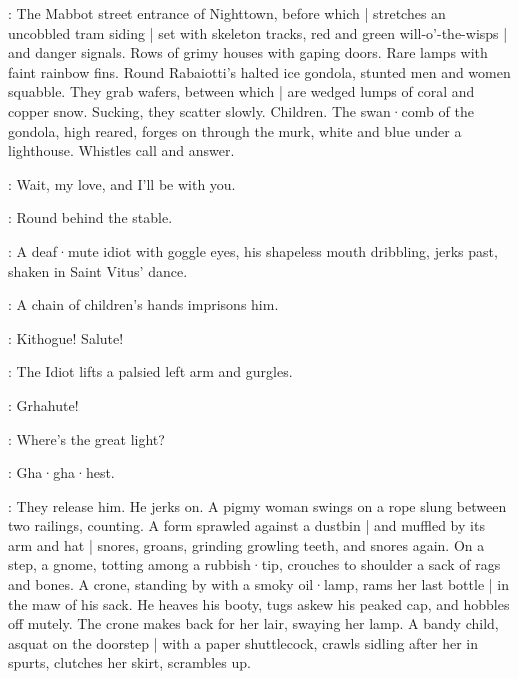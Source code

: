 
:
The Mabbot street entrance of Nighttown,
before which |
stretches an uncobbled tram siding |
set with skeleton tracks,
red and green will-o'-the-wisps |
and danger signals.
Rows of grimy houses with gaping doors.
Rare lamps with faint rainbow fins.
Round Rabaiotti's halted ice gondola,
stunted men and women squabble.
They grab wafers,
between which |
are wedged lumps of coral and copper snow.
Sucking,
they scatter slowly.
Children.
The swan·comb of the gondola,
high reared,
forges on through the murk,
white and blue under a lighthouse.
Whistles call and answer.

\Calls:
Wait,
my love,
and I'll be with you.

\Answers:
Round behind the stable.

:
A deaf·mute idiot with goggle eyes,
his shapeless mouth dribbling,
jerks past,
shaken in Saint Vitus' dance.

:
A chain of children's hands imprisons him.

\Children:
Kithogue!
Salute!

:
The Idiot lifts a palsied left arm and gurgles.

\Idiot:
Grhahute!%

\Children:
Where's the great light?

\Idiot:
Gha·gha·hest.

:
They release him.
He jerks on.
A pigmy woman swings on a rope slung between two railings,
counting.
A form sprawled against a dustbin |
and muffled by its arm and hat |
snores,
groans,
grinding growling teeth,
and snores again.
On a step,
a gnome,
totting among a rubbish·tip,
crouches to shoulder a sack of rags and bones.
A crone,
standing by with a smoky oil·lamp,
rams her last bottle |
in the maw of his sack.
He heaves his booty,
tugs askew his peaked cap,
and hobbles off mutely.
The crone makes back for her lair,
swaying her lamp.
A bandy child,
asquat on the doorstep |
with a paper shuttlecock,
crawls sidling after her in spurts,
clutches her skirt,
scrambles up.

